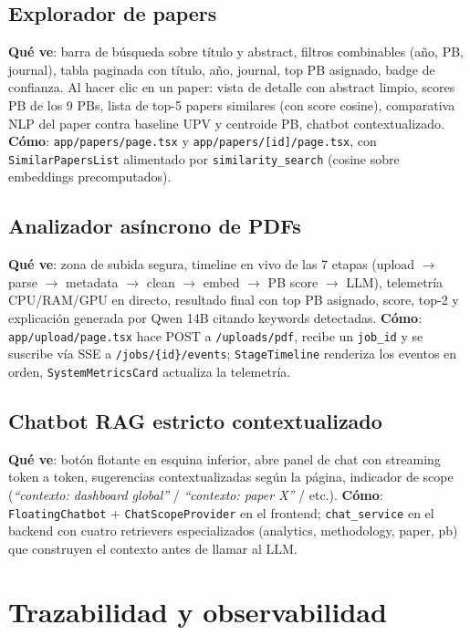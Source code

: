 \documentclass[11pt,a4paper]{article}
\newcommand{\modulo}[1]{\texttt{\textcolor{accent}{#1}}}
\newcommand{\file}[1]{\texttt{\small #1}}
\begin{document}
\subsection{Explorador de papers}

\textbf{Qué ve}: barra de búsqueda sobre título y abstract, filtros combinables (año, PB, journal), tabla paginada con título, año, journal, top PB asignado, badge de confianza. Al hacer clic en un paper: vista de detalle con abstract limpio, scores PB de los 9 PBs, lista de top-5 papers similares (con score cosine), comparativa NLP del paper contra baseline UPV y centroide PB, chatbot contextualizado. \textbf{Cómo}: \file{app/papers/page.tsx} y \file{app/papers/[id]/page.tsx}, con \modulo{SimilarPapersList} alimentado por \modulo{similarity\_search} (cosine sobre embeddings precomputados).

\subsection{Analizador asíncrono de PDFs}

\textbf{Qué ve}: zona de subida segura, timeline en vivo de las 7 etapas (upload $\to$ parse $\to$ metadata $\to$ clean $\to$ embed $\to$ PB score $\to$ LLM), telemetría CPU/RAM/GPU en directo, resultado final con top PB asignado, score, top-2 y explicación generada por Qwen 14B citando keywords detectadas. \textbf{Cómo}: \file{app/upload/page.tsx} hace POST a \texttt{/uploads/pdf}, recibe un \texttt{job\_id} y se suscribe vía SSE a \texttt{/jobs/\{id\}/events}; \modulo{StageTimeline} renderiza los eventos en orden, \modulo{SystemMetricsCard} actualiza la telemetría.

\subsection{Chatbot RAG estricto contextualizado}

\textbf{Qué ve}: botón flotante en esquina inferior, abre panel de chat con streaming token a token, sugerencias contextualizadas según la página, indicador de scope (\emph{``contexto: dashboard global''} / \emph{``contexto: paper X''} / etc.). \textbf{Cómo}: \modulo{FloatingChatbot} + \modulo{ChatScopeProvider} en el frontend; \modulo{chat\_service} en el backend con cuatro retrievers especializados (analytics, methodology, paper, pb) que construyen el contexto antes de llamar al LLM.

\section{Trazabilidad y observabilidad}
\end{document}
